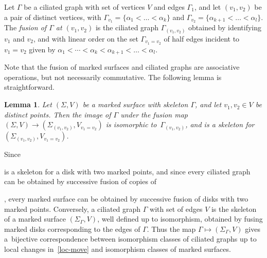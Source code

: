 \documentclass[10pt,a4paper]{amsart}
\numberwithin{equation}{section}
\newtheorem{Lemma}[Theorem]{Lemma}
\begin{document}
Let $\Gamma$ be a ciliated graph with set of vertices $V$ and edges $\Gamma_1$, and let $(v_1, v_2)$ be a pair of distinct vertices, with $\Gamma_{v_1} = \{\alpha_1< \dots < \alpha_k\}$ and $\Gamma_{v_2} = \{\alpha_{k+1} < \dots < \alpha_l\}$. The {\it fusion of $\Gamma$ at $(v_1, v_2)$} is the ciliated graph $\Gamma_{(v_1, v_2)}$ obtained by identifying $v_1$ and $v_2$, and with linear order on the set $\Gamma_{v_1 = v_2}$ of half edges incident to $v_1 = v_2$ given by $\alpha_1 < \cdots < \alpha_k < \alpha_{k+1} < \dots < \alpha_l$.

Note that the fusion of marked surfaces and ciliated graphs are associative operations, but not necessarily commutative. The following lemma is straightforward.

\begin{Lemma} \label{fusion-graph-surf}
Let $(\Sigma, V)$ be a marked surface with skeleton $\Gamma$, and let $v_1, v_2 \in V$ be distinct points. Then the image of $\Gamma$ under the fusion map $(\Sigma, V) \to (\Sigma_{(v_1, v_2)}, V_{v_1 =v_2})$ is isomorphic to~$\Gamma_{(v_1, v_2)}$, and is a skeleton for $(\Sigma_{(v_1, v_2)}, V_{v_1= v_2})$.
\end{Lemma}

Since
is a skeleton for a disk with two marked points, and since every ciliated graph can be obtained by successive fusion of copies of
,
 every marked surface can be obtained by successive fusion of disks with two marked points. Conversely, a ciliated graph $\Gamma$ with set of edges $V$ is the skeleton of a marked surface $(\Sigma_\Gamma, V)$, well defined up to isomorphism, obtained by fusing marked disks corresponding to the edges of $\Gamma$. Thus the map $\Gamma \mapsto (\Sigma_\Gamma, V)$ gives a~bijective correspondence between isomorphism classes of ciliated graphs up to local changes in~\eqref{loc-move} and isomorphism classes of marked surfaces.
\end{document}

